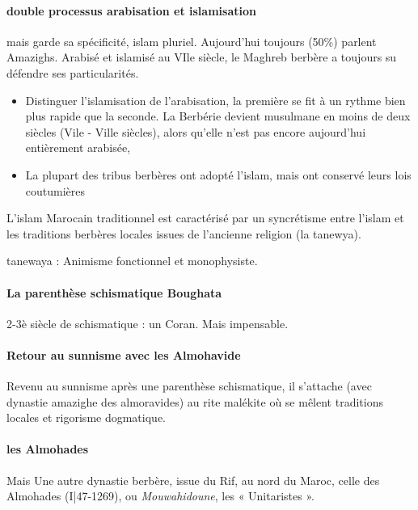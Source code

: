 \paragraph{double processus arabisation et islamisation} mais garde sa spécificité, islam pluriel. Aujourd'hui toujours (50\%) parlent Amazighs. Arabisé et islamisé au VIle siècle, le Maghreb berbère a toujours su défendre ses particularités.
\begin{itemize}
    \item  	Distinguer l'islamisation de l'arabisation, la première se fit à un rythme bien plus rapide que la seconde. La Berbérie devient musulmane en moins de deux siècles (Vile - Ville siècles), alors qu'elle n'est pas encore aujourd'hui entièrement arabisée,
  \item 	La plupart des tribus berbères ont adopté l'islam, mais ont conservé leurs lois coutumières
\end{itemize}

L'islam Marocain traditionnel est caractérisé par un syncrétisme entre l'islam et les traditions berbères locales issues de l'ancienne religion (la tanewya).

tanewaya : Animisme fonctionnel et monophysiste.

\paragraph{La parenthèse schismatique Boughata}  2-3è siècle de schismatique : un Coran. Mais impensable.

\paragraph{Retour au sunnisme avec les Almohavide} Revenu au sunnisme après une parenthèse schismatique, il s'attache (avec dynastie amazighe des almoravides) au rite malékite où se mêlent traditions locales et rigorisme dogmatique.


\paragraph{les Almohades} Mais Une autre dynastie berbère, issue du Rif, au nord du Maroc, celle des Almohades (I|47-1269),
ou \textit{Mouwahidoune}, les « Unitaristes ».


